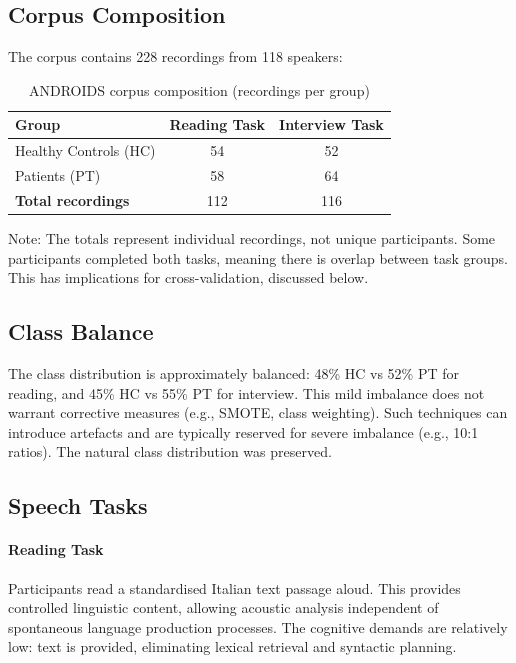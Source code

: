 \subsection{Corpus Composition}

The corpus contains 228 recordings from 118 speakers:

\begin{table}[h]
\centering
\caption{ANDROIDS corpus composition (recordings per group)}
\label{tab:corpus}
\begin{tabular}{lcc}
\hline
\textbf{Group} & \textbf{Reading Task} & \textbf{Interview Task} \\
\hline
Healthy Controls (HC) & 54 & 52 \\
Patients (PT) & 58 & 64 \\
\textbf{Total recordings} & 112 & 116 \\
\hline
\end{tabular}
\end{table}

Note: The totals represent individual recordings, not unique participants. Some participants completed both tasks, meaning there is overlap between task groups. This has implications for cross-validation, discussed below.

\subsection{Class Balance}

The class distribution is approximately balanced: 48\% HC vs 52\% PT for reading, and 45\% HC vs 55\% PT for interview. This mild imbalance does not warrant corrective measures (e.g., SMOTE, class weighting). Such techniques can introduce artefacts and are typically reserved for severe imbalance (e.g., 10:1 ratios). The natural class distribution was preserved.

\subsection{Speech Tasks}

\paragraph{Reading Task} Participants read a standardised Italian text passage aloud. This provides controlled linguistic content, allowing acoustic analysis independent of spontaneous language production processes. The cognitive demands are relatively low: text is provided, eliminating lexical retrieval and syntactic planning.

